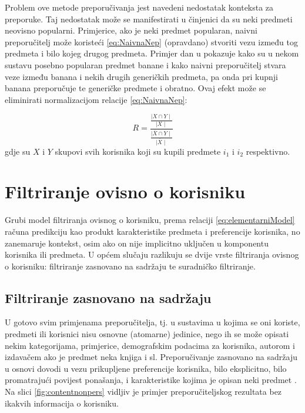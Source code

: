 \documentclass[times, utf8, diplomski, numeric]{fer}
\begin{document}
Problem ove metode preporučivanja jest navedeni nedostatak konteksta za
preporuke. Taj nedostatak može se manifestirati u činjenici da su neki predmeti
neovisno popularni. Primjerice, ako je neki predmet popularan, naivni
preporučitelj može koristeći \ref {eq:NaivnaNep} (opravdano) stvoriti vezu
između tog predmeta i bilo kojeg drugog predmeta. Primjer dan u
\cite{courseraRC} pokazuje kako su u nekom sustavu posebno popularan predmet
banane i kako naivni preporučitelj stvara veze između banana i nekih drugih
generičkih predmeta, pa onda pri kupnji banana preporučuje te generičke predmete
i obratno. Ovaj efekt može se eliminirati normalizacijom relacije
\ref{eq:NaivnaNep}:

\begin{equation}
\label{eq:nepersonalizirani}
	R = \frac
		{\frac
			{\mid X \cap Y \mid}
			{\mid X \mid}}
		{\frac
			{\mid \overline{X} \cap Y\mid}
			{\mid \overline{X} \mid}}
\end{equation}
gdje su $X$ i $Y$ skupovi svih korisnika koji su kupili predmete $i_1$ i $i_2$
respektivno.

\section{Filtriranje ovisno o korisniku}
Grubi model filtriranja ovisnog o korisniku, prema relaciji
\ref{eq:elementarniModel} računa predikciju kao produkt karakteristike predmeta
i preferencije korisnika, no zanemaruje kontekst, osim ako on nije implicitno
uključen u komponentu korisnika ili predmeta. U općem slučaju razlikuju se dvije
vrste filtriranja ovisnog o korisniku: filtriranje zasnovano na sadržaju te
suradničko filtriranje.

\subsection{Filtriranje zasnovano na sadržaju}
U gotovo svim primjenama preporučitelja, tj. u sustavima u kojima se oni
koriste, predmeti ili korisnici nisu osnovne (atomarne) jedinice, nego ih se
može opisati nekim kategorijama, primjerice, demografskim podacima za korisnika,
autorom i izdavačem ako je predmet neka knjiga i sl. Preporučivanje zasnovano
na sadržaju u osnovi dovodi u vezu prikupljene preferencije korisnika, bilo
eksplicitno, bilo promatrajući povijest ponašanja, i karakteristike kojima je
opisan neki predmet \cite{RSHandbook}. Na slici \ref{fig:contentnonpers} vidljiv
je primjer preporučiteljskog rezultata bez ikakvih informacija o korisniku.
\end{document}
